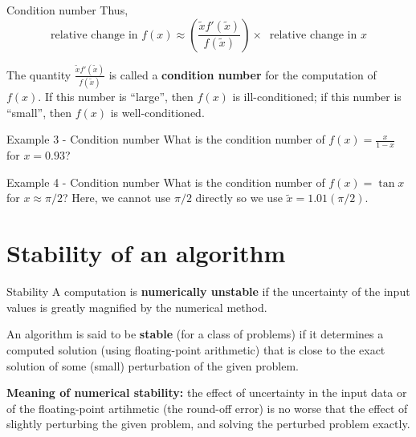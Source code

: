 \documentclass[12pt]{beamer}
\begin{document}
\begin{frame}{Condition number}
Thus, 
\[ 
\mbox{relative change in } f(x) \approx \left( \frac{\tilde xf'(\tilde x)}{f(\tilde x)} \right) \times \;\; \mbox{relative change in } x 
\]

The quantity $\frac{\tilde xf'(\tilde x)}{f(\tilde x)}$ is called a {\bf condition number} for the computation of $f(x)$. If this number is ``large'', then $f(x)$ is ill-conditioned; if this number is ``small'', then $f(x)$ is well-conditioned. 
\end{frame} 

\begin{frame}{Example 3 - Condition number}
What is the condition number of $f(x)=\frac{x}{1-x}$ for $x=0.93$? 
\vspace{3 in}
\end{frame}

\begin{frame}{Example 4 - Condition number}
What is the condition number of $f(x)=\tan{x}$ for $x \approx \pi/2$? Here, we cannot use $\pi/2$ directly so we use $\tilde{x}=1.01(\pi/2)$.
\vspace{3 in}
\end{frame}  

\section{Stability of an algorithm} 

\begin{frame}{Stability} 
A computation is {\bf numerically unstable} if the uncertainty of the input values is greatly magnified by the numerical method. 

\begin{definition} 
An algorithm is said to be {\bf stable} (for a class
of problems) if it determines a computed solution (using
floating-point arithmetic) that is close to the exact solution of some
(small) perturbation of the given problem.
\end{definition} 

{\bf Meaning of numerical stability:} the effect of uncertainty in the input data or of the floating-point artihmetic (the round-off error) is no worse that the effect of slightly perturbing the given problem, and solving the perturbed problem exactly. 



\end{frame} 
\end{document}
